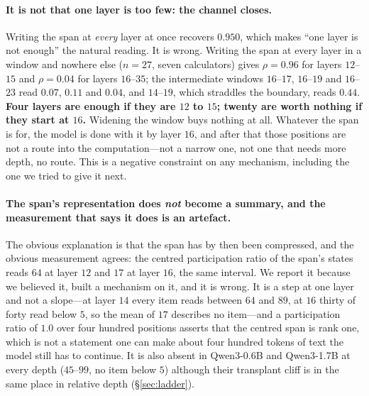 \documentclass{article}
\begin{document}
\paragraph{It is not that one layer is too few: the channel closes.} Writing the
span at \emph{every} layer at once recovers $0.950$, which makes ``one layer is
not enough'' the natural reading. It is wrong. Writing the span at every layer
in a window and nowhere else ($n=27$, seven calculators) gives $\rho = 0.96$ for
layers $12$--$15$ and $\rho = 0.04$ for layers $16$--$35$; the intermediate
windows $16$--$17$, $16$--$19$ and $16$--$23$ read $0.07$, $0.11$ and $0.04$,
and $14$--$19$, which straddles the boundary, reads $0.44$. \textbf{Four layers
are enough if they are $12$ to $15$; twenty are worth nothing if they start at
$16$.} Widening the window buys nothing at all. Whatever the span is for, the
model is done with it by layer $16$, and after that those positions are not a
route into the computation---not a narrow one, not one that needs more depth, no
route. This is a negative constraint on any mechanism, including the one we
tried to give it next.

\paragraph{The span's representation does \emph{not} become a summary, and the
measurement that says it does is an artefact.} The obvious explanation is that
the span has by then been compressed, and the obvious measurement agrees: the
centred participation ratio of the span's states reads $64$ at layer $12$ and
$17$ at layer $16$, the same interval. We report it because we believed it,
built a mechanism on it, and it is wrong. It is a step at one layer and not a
slope---at layer $14$ every item reads between $64$ and $89$, at $16$ thirty of
forty read below $5$, so the mean of $17$ describes no item---and a
participation ratio of $1.0$ over four hundred positions asserts that the
centred span is rank one, which is not a statement one can make about four
hundred tokens of text the model still has to continue. It is also absent in
Qwen3-0.6B and Qwen3-1.7B at every depth ($45$--$99$, no item below $5$) although
their transplant cliff is in the same place in relative depth
(\S\ref{sec:ladder}).
\end{document}
